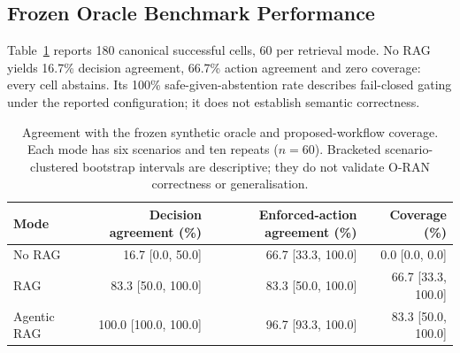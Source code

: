 \documentclass[journal]{IEEEtran}
\newif\ifshowrevisions
\newenvironment{revision}{\begingroup\ifshowrevisions\color{blue}\else\color{black}\fi}{\endgroup}
\newcommand{\rev}[1]{{\ifshowrevisions\color{blue}\else\color{black}\fi #1}}
\begin{document}
\begin{revision}
\subsection{Frozen Oracle Benchmark Performance}
Table~\ref{tab:oracle-results} reports 180 canonical successful cells,
60 per retrieval mode. No RAG yields 16.7\% decision agreement, 66.7\%
action agreement and zero coverage: every cell abstains. Its 100\%
safe-given-abstention rate describes fail-closed gating under the reported
configuration; it does not establish semantic correctness.

\begin{revision}
\begin{table}[!t]
\centering\ifshowrevisions\color{blue}\else\color{black}\fi
\caption{\rev{Agreement with the frozen synthetic oracle and proposed-workflow
coverage. Each mode has six scenarios and ten repeats ($n=60$). Bracketed
scenario-clustered bootstrap intervals are descriptive; they do not validate
O-RAN correctness or generalisation.}}
\label{tab:oracle-results}
\begin{tabular}{lrrr}
\toprule Mode & Decision agreement (\%) & Enforced-action agreement (\%) & Coverage (\%) \\
\midrule
No RAG & 16.7 [0.0, 50.0] & 66.7 [33.3, 100.0] & 0.0 [0.0, 0.0] \\
RAG & 83.3 [50.0, 100.0] & 83.3 [50.0, 100.0] & 66.7 [33.3, 100.0] \\
Agentic RAG & 100.0 [100.0, 100.0] & 96.7 [93.3, 100.0] & 83.3 [50.0, 100.0] \\
\bottomrule
\end{tabular}
\end{table}
\end{revision}


\end{revision}
\end{document}
